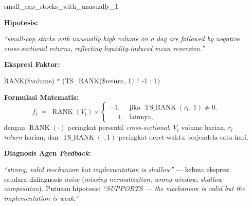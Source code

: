 
\begin{kartufaktor}{small\_cap\_stocks\_with\_unusually\_1}


\vspace{2mm}
\textbf{Hipotesis:}\par
\textit{``small-cap stocks with unusually high volume on a day are followed by
negative cross-sectional returns, reflecting liquidity-induced mean
reversion.''}

\vspace{2.5mm}
\textbf{Ekspresi Faktor:}
\begin{kotakekspresi}
RANK(\$volume) * (TS\_RANK(\$return, 1) ? -1 : 1)
\end{kotakekspresi}

\textbf{Formulasi Matematis:}
\begin{equation*}
  f_t \;=\; \operatorname{RANK}(V_t)\times
  \begin{cases}
    -1, & \text{jika } \operatorname{TS\_RANK}(r_t,\,1)\neq 0,\\[1mm]
    \phantom{-}1, & \text{lainnya,}
  \end{cases}
\end{equation*}
dengan $\operatorname{RANK}(\cdot)$ peringkat persentil \textit{cross-sectional},
$V_t$ volume harian, $r_t$ \textit{return} harian, dan
$\operatorname{TS\_RANK}(\cdot,1)$ peringkat deret-waktu berjendela satu hari.

\vspace{2mm}
\textbf{Diagnosis Agen \textit{Feedback}:}\par
\textit{``strong, valid mechanism but implementation is shallow''} ---
kelima ekspresi saudara didiagnosis
\textit{noise} (\textit{missing normalization}, \textit{wrong window},
\textit{shallow composition}). Putusan hipotesis:
\textit{``SUPPORTS --- the mechanism is valid but the implementation is weak.''}

\end{kartufaktor}
